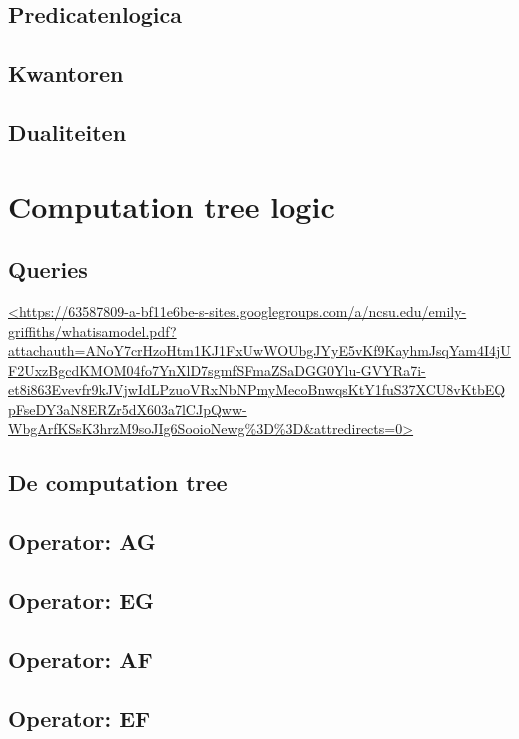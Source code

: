 \documentclass{article}
\begin{document}
\subsection{Predicatenlogica}

\subsection{Kwantoren}

\subsection{Dualiteiten}

\section{Computation tree logic}

\subsection{Queries}
{\tiny\url{<https://63587809-a-bf11e6be-s-sites.googlegroups.com/a/ncsu.edu/emily-griffiths/whatisamodel.pdf?attachauth=ANoY7crHzoHtm1KJ1FxUwWOUbgJYyE5vKf9KayhmJsqYam4I4jUF2UxzBgcdKMOM04fo7YnXlD7sgmfSFmaZSaDGG0Ylu-GVYRa7i-et8i863Evevfr9kJVjwIdLPzuoVRxNbNPmyMecoBnwqsKtY1fuS37XCU8vKtbEQpFseDY3aN8ERZr5dX603a7lCJpQww-WbgArfKSsK3hrzM9soJIg6SooioNewg%3D%3D&attredirects=0>} }
  
\subsection{De computation tree}


\subsection{Operator: AG}



\subsection{Operator: EG}
	
\subsection{Operator: AF}

\subsection{Operator: EF}
\end{document}
